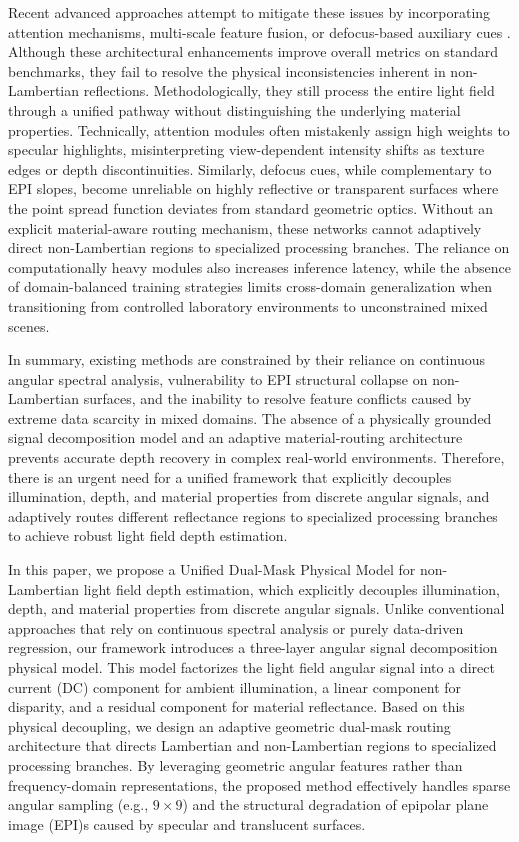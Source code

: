 \documentclass[lettersize,journal]{IEEEtran}
\begin{document}
Recent advanced approaches attempt to mitigate these issues by incorporating attention mechanisms, multi-scale feature fusion, or defocus-based auxiliary cues . Although these architectural enhancements improve overall metrics on standard benchmarks, they fail to resolve the physical inconsistencies inherent in non-Lambertian reflections. Methodologically, they still process the entire light field through a unified pathway without distinguishing the underlying material properties. Technically, attention modules often mistakenly assign high weights to specular highlights, misinterpreting view-dependent intensity shifts as texture edges or depth discontinuities. Similarly, defocus cues, while complementary to EPI slopes, become unreliable on highly reflective or transparent surfaces where the point spread function deviates from standard geometric optics. Without an explicit material-aware routing mechanism, these networks cannot adaptively direct non-Lambertian regions to specialized processing branches. The reliance on computationally heavy modules also increases inference latency, while the absence of domain-balanced training strategies limits cross-domain generalization when transitioning from controlled laboratory environments to unconstrained mixed scenes.

In summary, existing methods are constrained by their reliance on continuous angular spectral analysis, vulnerability to EPI structural collapse on non-Lambertian surfaces, and the inability to resolve feature conflicts caused by extreme data scarcity in mixed domains. The absence of a physically grounded signal decomposition model and an adaptive material-routing architecture prevents accurate depth recovery in complex real-world environments. Therefore, there is an urgent need for a unified framework that explicitly decouples illumination, depth, and material properties from discrete angular signals, and adaptively routes different reflectance regions to specialized processing branches to achieve robust light field depth estimation.

In this paper, we propose a Unified Dual-Mask Physical Model for non-Lambertian light field depth estimation, which explicitly decouples illumination, depth, and material properties from discrete angular signals. Unlike conventional approaches that rely on continuous spectral analysis or purely data-driven regression, our framework introduces a three-layer angular signal decomposition physical model. This model factorizes the light field angular signal into a direct current (DC) component for ambient illumination, a linear component for disparity, and a residual component for material reflectance. Based on this physical decoupling, we design an adaptive geometric dual-mask routing architecture that directs Lambertian and non-Lambertian regions to specialized processing branches. By leveraging geometric angular features rather than frequency-domain representations, the proposed method effectively handles sparse angular sampling (e.g., $9 \times 9$) and the structural degradation of epipolar plane image (EPI)s caused by specular and translucent surfaces.
\end{document}
